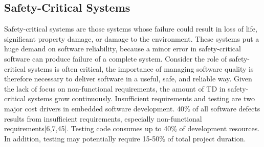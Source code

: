\subsection{Safety-Critical Systems}
Safety-critical systems are those systems whose failure could result in loss of life, significant property damage, or damage to the environment\cite{knight2002safety}. These systems put a huge demand on software reliability, because a minor error in safety-critical software can produce failure of a complete system\cite{ebert2009embedded,trienekens2010quality,pretschner2007software}. Consider the role of safety-critical systems is often critical, the importance of managing software quality is therefore necessary to deliver software in a useful, safe, and reliable way. Given the lack of focus on non-functional requirements, the amount of TD in safety-critical systems grow continuously. Insufficient requirements and testing are two major cost drivers in embedded software development\cite{ebert2009embedded,graaf2003embedded}. 40\% of all software defects results from insufficient requirements, especially non-functional requirements[6,7,45]\cite{ebert2009embedded,graaf2003embedded,washizaki2007quality}. Testing code consumes up to 40\% of development resources. In addition, testing may potentially require 15-50\% of total project duration\cite{ebert2009embedded}.  

